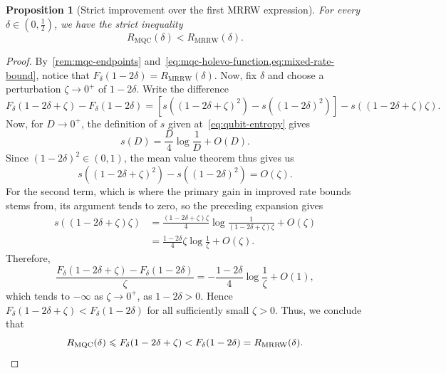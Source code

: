 \documentclass[11pt]{article}
\renewcommand{\leq}{\leqslant}
\newtheorem{prop}[prop]{Proposition}
\theoremstyle{remark}
\newcommand{\MRRW}{R_{\mathrm{MRRW}}}
\newcommand{\MQC}{\mathrm{MQC}}
\begin{document}
\begin{prop}[Strict improvement over the first MRRW expression]
\label{prop:mqc-strict-improvement}
For every $\delta \in (0,\frac{1}{2})$, we have the strict inequality
\begin{equation*}
R_{\MQC}(\delta) < \MRRW(\delta).
\end{equation*}
\end{prop}
\begin{proof}
By~\cref{rem:mqc-endpoints} and~\cref{eq:mqc-holevo-function,eq:mixed-rate-bound}, notice that $F_\delta(1-2\delta) = \MRRW(\delta)$. Now, fix $\delta$ and choose a perturbation $\zeta \to 0^+$ of $1-2\delta$. Write the difference
\begin{equation*}
F_\delta(1-2\delta+\zeta)-F_\delta(1-2\delta)
= \left[s((1-2\delta+\zeta)^2)-s((1-2\delta)^2)\right]
-s\left((1-2\delta+\zeta)\zeta\right).
\end{equation*}
Now, for $D \to 0^+$, the definition of $s$ given at~\eqref{eq:qubit-entropy} gives
\begin{equation*}
s(D)=\frac{D}{4}\log{\frac{1}{D}}+O(D).
\end{equation*}
Since $(1-2\delta)^2\in(0,1)$, the mean value theorem thus gives us
\begin{equation*}
s((1-2\delta+\zeta)^2)-s((1-2\delta)^2)=O(\zeta).
\end{equation*}
For the second term, which is where the primary gain in improved rate bounds stems from, its argument tends to zero, so the preceding expansion gives
\begin{align*}
s((1-2\delta+\zeta)\zeta)
&=\frac{(1-2\delta+\zeta)\zeta}{4}
  \log{\frac{1}{(1-2\delta+\zeta)\zeta}}+O(\zeta)\\
&=\frac{1-2\delta}{4}\zeta\log{\frac{1}{\zeta}}+O(\zeta).
\end{align*}
Therefore,
\begin{equation*}
\frac{F_\delta(1-2\delta+\zeta)-F_\delta(1-2\delta)}{\zeta}
=-\frac{1-2\delta}{4}\log{\frac{1}{\zeta}}+O(1),
\end{equation*}
which tends to $-\infty$ as $\zeta \to 0^+$, as $1-2\delta>0$. Hence $F_\delta(1-2\delta+\zeta)< F_\delta(1-2\delta)$ for all sufficiently small $\zeta>0$. Thus, we conclude that
\begin{equation*}
R_{\MQC}(\delta)
\leq F_\delta(1-2\delta+\zeta)
<F_\delta(1-2\delta)
=\MRRW(\delta).\qedhere
\end{equation*}
\end{proof}
\end{document}
